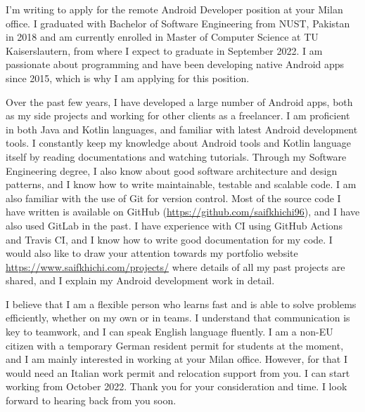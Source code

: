 I’m writing to apply for the remote Android Developer position at your Milan office. I graduated with Bachelor of Software Engineering from NUST, Pakistan in 2018 and am currently enrolled in Master of Computer Science at TU Kaiserslautern, from where I expect to graduate in September 2022. I am passionate about programming and have been developing native Android apps since 2015, which is why I am applying for this position.

Over the past few years, I have developed a large number of Android apps, both as my side projects and working for other clients as a freelancer. I am proficient in both Java and Kotlin languages, and familiar with latest Android development tools. I constantly keep my knowledge about Android tools and Kotlin language itself by reading documentations and watching tutorials. Through my Software Engineering degree, I also know about good software architecture and design patterns, and I know how to write maintainable, testable and scalable code. I am also familiar with the use of Git for version control. Most of the source code I have written is available on GitHub (\url{https://github.com/saifkhichi96}), and I have also used GitLab in the past. I have experience with CI using GitHub Actions and Travis CI, and I know how to write good documentation for my code. I would also like to draw your attention towards my portfolio website \url{https://www.saifkhichi.com/projects/} where details of all my past projects are shared, and I explain my Android development work in detail.

I believe that I am a flexible person who learns fast and is able to solve problems efficiently, whether on my own or in teams. I understand that communication is key to teamwork, and I can speak English language fluently. I am a non-EU citizen with a temporary German resident permit for students at the moment, and I am mainly interested in working at your Milan office. However, for that I would need an Italian work permit and relocation support from you. I can start working from October 2022. Thank you for your consideration and time. I look forward to hearing back from you soon.